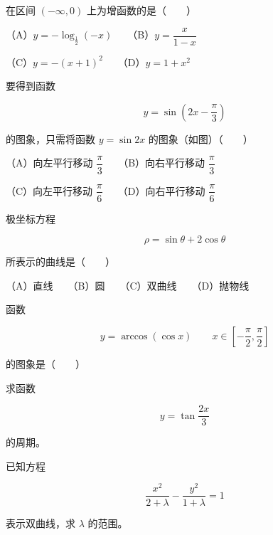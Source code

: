 \begin{question}
在区间 $(-\infty,0)$ 上为增函数的是\mbox{（　　）}

（A）$y=-\log_{\frac12}(-x)$　　（B）$y=\dfrac{x}{1-x}$

（C）$y=-(x+1)^2$　　（D）$y=1+x^2$

\Needspace{0.4\textheight}
\end{question}
\begin{question}
要得到函数

\nopagebreak[4]
\[
y=\sin\left(2x-\frac\pi3\right)
\]

的图象，只需将函数 $y=\sin2x$ 的图象（如图）\mbox{（　　）}
\nopagebreak[4]
\begin{center}\end{center}
\nopagebreak[4]
（A）向左平行移动 $\dfrac\pi3$　　（B）向右平行移动 $\dfrac\pi3$

（C）向左平行移动 $\dfrac\pi6$　　（D）向右平行移动 $\dfrac\pi6$

\end{question}
\begin{question}
极坐标方程

\nopagebreak[4]
\[
\rho=\sin\theta+2\cos\theta
\]

所表示的曲线是\mbox{（　　）}

（A）直线　　（B）圆　　（C）双曲线　　（D）抛物线

\Needspace{0.4\textheight}
\end{question}
\begin{question}
函数

\nopagebreak[4]
\[
y=\arccos(\cos x)\qquad x\in\left[-\frac\pi2,\frac\pi2\right]
\]

的图象是\mbox{（　　）}
\nopagebreak[4]
\begin{center}\end{center}
\nopagebreak[4]
\end{question}
\begin{question}
求函数

\nopagebreak[4]
\[
y=\tan\frac{2x}{3}
\]

的周期。

\end{question}
\begin{question}
已知方程

\nopagebreak[4]
\[
\frac{x^2}{2+\lambda}-\frac{y^2}{1+\lambda}=1
\]

表示双曲线，求 $\lambda$ 的范围。

\end{question}
